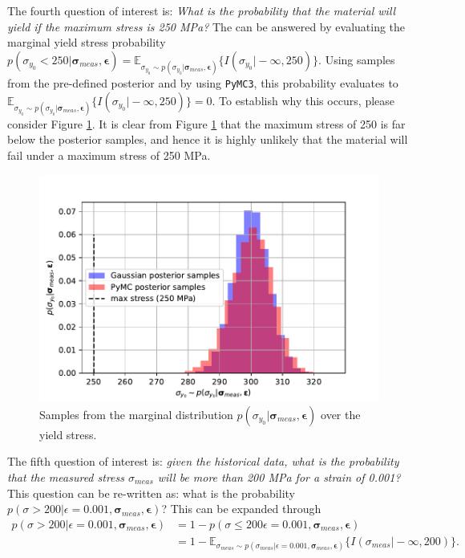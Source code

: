 \documentclass{article}
\begin{document}
	The fourth question of interest is: \emph{What is the probability that the material will yield if the maximum stress is 250 MPa?} The can be answered by evaluating the marginal yield stress probability $p(\sigma_{y_0} < 250 \vert \boldsymbol\sigma_{meas}, \boldsymbol\epsilon) = \mathbb{E}_{\sigma_{y_0} \sim p(\sigma_{y_0} \vert \boldsymbol\sigma_{meas}, \boldsymbol\epsilon)}\{I(\sigma_{y_0} \vert -\infty, 250)\}$. Using samples from the pre-defined posterior and by using \texttt{PyMC3}, this probability evaluates to $\mathbb{E}_{\sigma_{y_0} \sim p(\sigma_{y_0} \vert \boldsymbol\sigma_{meas}, \boldsymbol\epsilon)}\{I(\sigma_{y_0} \vert -\infty, 250)\} = 0$. To establish why this occurs, please consider Figure \ref{fig:Q3_yield}. It is clear from Figure \ref{fig:Q3_yield} that the maximum stress of 250 is far below the posterior samples, and hence it is highly unlikely that the material will fail under a maximum stress of 250 MPa.
	\begin{figure}[htb!]
		\centering
		\includegraphics[scale=0.5]{Q3b_3.pdf}
		\caption{Samples from the marginal distribution $ p(\sigma_{y_0} \vert \boldsymbol\sigma_{meas}, \boldsymbol\epsilon)$ over the yield stress.}
		\label{fig:Q3_yield}
	\end{figure}

	The fifth question of interest is: \emph{given the historical data, what is the probability that the measured stress $\sigma_{meas}$ will be more than 200 MPa for a strain of 0.001?} This question can be re-written as: what is the probability $p(\sigma > 200 \vert \epsilon = 0.001, \boldsymbol\sigma_{meas}, \boldsymbol\epsilon)$? This can be expanded through
	\begin{equation}
		\begin{aligned}
		p(\sigma > 200 \vert \epsilon = 0.001, \boldsymbol\sigma_{meas}, \boldsymbol\epsilon) &= 1 - p(\sigma \leq 200 \epsilon = 0.001, \boldsymbol\sigma_{meas}, \boldsymbol\epsilon) \\
		&= 1 - \mathbb{E}_{\sigma_{meas} \sim p(\sigma_{meas} \vert  \epsilon = 0.001, \boldsymbol\sigma_{meas}, \boldsymbol\epsilon)} \{ I(\sigma_{meas} \vert -\infty, 200) \}.
		\end{aligned}
	\end{equation}
\end{document}
